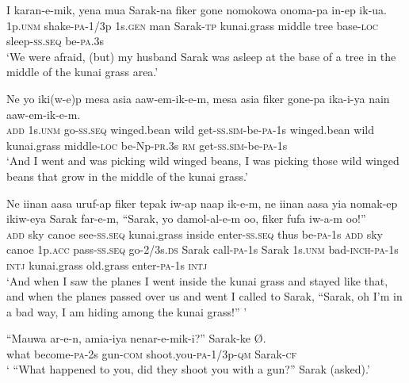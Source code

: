 {\ea\label{ex:a:x77}
\gll  I  karan-e-mik,  yena  mua  Sarak-na  fiker  gone  nomokowa  onoma-pa  in-ep  ik-ua. \\
1p.\textsc{unm}  shake-\textsc{pa}-1/3p  1s.\textsc{gen}  man  Sarak-\textsc{tp}  kunai.grass middle  tree  base-\textsc{loc}  sleep-\textsc{ss.seq}  be-\textsc{pa}.3s \\
\glt ‘We were afraid, (but) my husband Sarak was asleep at the base of a tree in the middle of the kunai grass area.’ \\
\z


\ea\label{ex:a:x78}
\gll  Ne  yo  iki(w-e)p  mesa  asia  aaw-em-ik-e-m, mesa  asia  fiker  gone-pa  ika-i-ya  nain  aaw-em-ik-e-m. \\
\textsc{add}  1s.\textsc{unm}  go-\textsc{ss.seq}  winged.bean  wild  get-\textsc{ss}.\textsc{sim}-be-\textsc{pa}-1s winged.bean  wild  kunai.grass  middle-\textsc{loc}  be-Np-\textsc{pr}.3s  \textsc{rm} get-\textsc{ss}.\textsc{sim}-be-\textsc{pa}-1s\\ 
\glt ‘And I went and was picking wild winged beans, I was picking those wild winged beans that grow in the middle of the kunai grass.’ \\
\z


\ea\label{ex:a:x79}
\gll  Ne  iinan  aasa  uruf-ap  fiker  tepak  iw-ap naap  ik-e-m,  ne  iinan  aasa  yia  nomak-ep ikiw-eya  Sarak  far-e-m,  “Sarak,  yo  damol-al-e-m oo,  fiker  fufa  iw-a-m  oo!” \\
\textsc{add}  sky  canoe  see-\textsc{ss.seq}  kunai.grass  inside  enter-\textsc{ss.seq} thus  be-\textsc{pa}-1s  \textsc{add}  sky  canoe  1p.\textsc{acc}  pass-\textsc{ss.seq} go-2/3s.\textsc{ds}  Sarak  call-\textsc{pa}-1s  Sarak  1s.\textsc{unm}  bad-\textsc{inch}-\textsc{pa}-1s \textsc{intj}  kunai.grass  old.grass  enter-\textsc{pa}-1s  \textsc{intj} \\ 
\glt ‘And when I saw the planes I went inside the kunai grass and stayed like that, and when the planes passed over us and went I called to Sarak, “Sarak, oh I'm in a bad way, I am hiding among the kunai grass!” ’ \\
\z


\ea\label{ex:a:x80}
\gll  “Mauwa  ar-e-n,  amia-iya  nenar-e-mik-i?”  Sarak-ke  Ø. \\
what  become-\textsc{pa}-2s  gun-\textsc{com}  shoot.you-\textsc{pa}-1/3p-\textsc{qm} Sarak-\textsc{cf} \\ 
\glt ‘ “What happened to you, did they shoot you with a gun?” Sarak (asked).’ \\
\z


}
